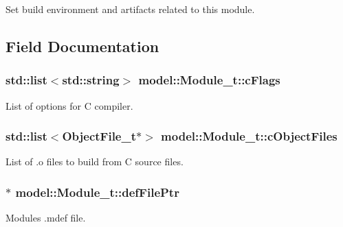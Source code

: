 Set build environment and artifacts related to this module. 

\subsection{Field Documentation}
\subsubsection[{\texorpdfstring{c\+Flags}{cFlags}}]{\setlength{\rightskip}{0pt plus 5cm}std\+::list$<$std\+::string$>$ model\+::\+Module\+\_\+t\+::c\+Flags}\hypertarget{structmodel_1_1_module__t_a7e919967040358e493068b83f1ed8e10}{}\label{structmodel_1_1_module__t_a7e919967040358e493068b83f1ed8e10}


List of options for C compiler. 

\subsubsection[{\texorpdfstring{c\+Object\+Files}{cObjectFiles}}]{\setlength{\rightskip}{0pt plus 5cm}std\+::list$<${\bf Object\+File\+\_\+t}$\ast$$>$ model\+::\+Module\+\_\+t\+::c\+Object\+Files}\hypertarget{structmodel_1_1_module__t_a234e09a3d01721b0890b12fcadd3e7b4}{}\label{structmodel_1_1_module__t_a234e09a3d01721b0890b12fcadd3e7b4}


List of .o files to build from C source files. 

\subsubsection[{\texorpdfstring{def\+File\+Ptr}{defFilePtr}}]{$\ast$ model\+::\+Module\+\_\+t\+::def\+File\+Ptr}\hypertarget{structmodel_1_1_module__t_afef2bb4e03f03d61e54c8a9aed70f7ac}{}\label{structmodel_1_1_module__t_afef2bb4e03f03d61e54c8a9aed70f7ac}


Module\textquotesingle{}s .mdef file. 


